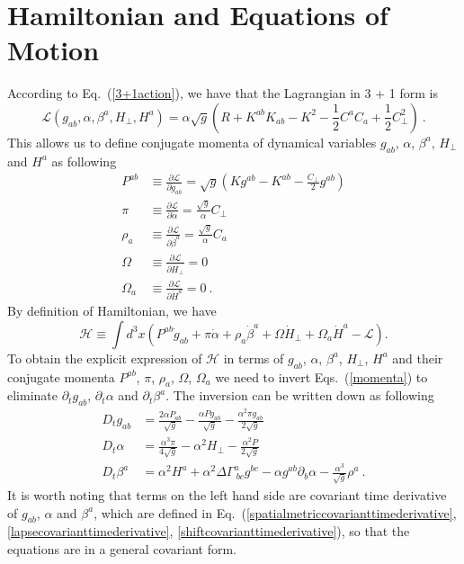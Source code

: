 \section{Hamiltonian and Equations of Motion}\label{hamiltonian}
According to Eq.~(\ref{3+1action}), we have that the Lagrangian in 3 + 1 form is
\begin{equation}
\mathscr{L}\left(g_{ab}, \alpha, \beta^{a}, H_{\perp}, H^{a}\right) = \alpha \sqrt{g} \left( R + K^{ab}K_{ab} - K^{2} - \frac{1}{2}C^{a}C_{a} + \frac{1}{2}C_{\perp}^{2}\right) \ .
\end{equation}
This allows us to define conjugate momenta of dynamical variables $g_{ab}$, $\alpha$, $\beta^{a}$, $H_{\perp}$ and $H^{a}$ as following
\begin{subequations}\label{momenta}
\begin{align}
P^{ab} & \equiv \frac{\partial \mathscr{L}}{\partial {\dot g}_{ab}} = \sqrt{g}\left(Kg^{ab} - K^{ab} - \frac{C_{\perp}}{2}g^{ab}\right)\\
\pi & \equiv \frac{\partial \mathscr{L}}{\partial {\dot \alpha}} = \frac{\sqrt{g}}{\alpha}C_{\perp}\\
\rho_{a} & \equiv \frac{\partial \mathscr{L}}{\partial {\dot \beta}^{a}} = \frac{\sqrt{g}}{\alpha}C_{a}\\
\Omega & \equiv \frac{\partial \mathscr{L}}{\partial {\dot H}_{\perp}} = 0\\
\Omega_{a} & \equiv \frac{\partial \mathscr{L}}{\partial {\dot H}^{a}} = 0 \ .  
\end{align}
\end{subequations}
By definition of Hamiltonian, we have
\begin{equation}
\mathscr{H} \equiv \int d^{3}x \left(P^{ab}{\dot g}_{ab} + \pi{\dot \alpha} + \rho_{a}{\dot \beta}^{a} + \Omega {\dot H}_{\perp} + \Omega_{a}{\dot H}^{a} - \mathscr{L} \right). 
\end{equation}
To obtain the explicit expression of $\mathscr{H}$ in terms of $g_{ab}$, $\alpha$, $\beta^{a}$, $H_{\perp}$, $H^{a}$ and their conjugate momenta $P^{ab}$, $\pi$, $\rho_{a}$, $\Omega$, $\Omega_{a}$ we need to invert Eqs.~(\ref{momenta}) to eliminate $\partial_{t}g_{ab}$, $\partial_{t}\alpha$ and $\partial_{t}\beta^{a}$. The inversion can be written down as following
\begin{subequations}
\begin{align}
D_{t}g_{ab} & = \frac{2\alpha P_{ab}}{\sqrt{g}} - \frac{\alpha P g_{ab}}{\sqrt{g}} - \frac{\alpha^{2}\pi g_{ab}}{2\sqrt{g}}\\
D_{t}\alpha & = \frac{\alpha^{3}\pi}{4\sqrt{g}} - \alpha^{2}H_{\perp} - \frac{\alpha^{2}P}{2\sqrt{g}}\\
D_{t}\beta^{a} & = \alpha^{2}H^{a} + \alpha^{2}\Delta \Gamma^{a}_{~bc}g^{bc} - \alpha g^{ab}\partial_{b}\alpha - \frac{\alpha^{3}}{\sqrt{g}}\rho^{a} \ .
\end{align}
\end{subequations}
It is worth noting that terms on the left hand side are covariant time derivative of $g_{ab}$, $\alpha$ and $\beta^{a}$, which are defined in Eq.~(\ref{spatialmetriccovarianttimederivative}, \ref{lapsecovarianttimederivative}, \ref{shiftcovarianttimederivative}), so that the equations are in a general covariant form. 

